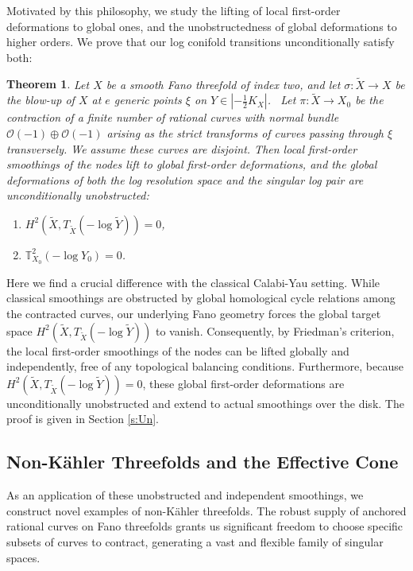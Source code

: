 \documentclass[11pt]{article}
\newtheorem{mainthm}{Theorem}
\theoremstyle{definition}
\newcommand{\abs}[1]{\left\vert#1\right\vert}
\newcommand{\OO}{\mathcal{O}}
\begin{document}
Motivated by this philosophy, we study the lifting of local first-order deformations to global ones, and the unobstructedness of global deformations to higher orders. We prove that our log conifold transitions unconditionally satisfy both:
\begin{mainthm} \label{thm:A}
 Let $X$ be a smooth Fano threefold of index two, and let $\sigma:\tilde X\to X$ be the blow-up of $X$ at $e$ generic points $\xi$ on $Y\in \abs{-\frac{1}{2} K_X}$. 
 Let $\pi:\tilde X \to X_0$ be the contraction of a finite number of rational curves with normal bundle $\OO(-1)\oplus \OO(-1)$ arising as the strict transforms of curves passing through $\xi$ transversely. \emph{ We assume these curves are disjoint.}
Then local first-order smoothings of the nodes lift to global first-order deformations, and the global deformations of both the log resolution space and the singular log pair are unconditionally unobstructed: 
\begin{enumerate}
 \item $H^2(\tilde{X}, T_{\tilde X}(-\log \tilde Y))=0$,
 \item $\mathbb{T}_{X_0}^2(-\log Y_0)=0$.
\end{enumerate}
\end{mainthm}

Here we find a crucial difference with the classical Calabi-Yau setting. While classical smoothings are obstructed by global homological cycle relations among the contracted curves, our underlying Fano geometry forces the global target space $H^2(\tilde{X}, T_{\tilde X}(-\log \tilde Y))$ to vanish. Consequently, by Friedman's criterion, the local first-order smoothings of the nodes can be lifted globally and independently, free of any topological balancing conditions. Furthermore, because $H^2(\tilde{X}, T_{\tilde X}(-\log \tilde Y))=0$, these global first-order deformations are unconditionally unobstructed and extend to actual smoothings over the disk. The proof is given in Section \ref{s:Un}.

\subsection{Non-K\"ahler Threefolds and the Effective Cone}
As an application of these unobstructed and independent smoothings, we construct novel examples of non-K\"ahler threefolds. The robust supply of anchored rational curves on Fano threefolds grants us significant freedom to choose specific subsets of curves to contract, generating a vast and flexible family of singular spaces. 
\end{document}
